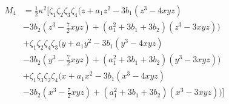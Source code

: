 \begin{equation}\begin{split}
{M_4} &= \frac12 \kappa^2\Big[\zeta_1\zeta_2\zeta_3\zeta_4(z + a_1 z^2  -3b_1(z^3-4xyz) \\& -3b_2(z^3-\frac72xyz)
+(a_1^2+3b_1 + 3b_2)(z^3-3xyz))\\&
+ \zeta_1\zeta_2\zeta_4\zeta_3(y + a_1 y^2 -3b_1(y^3-4xyz)\\&-3b_2(y^3-\frac72xyz)
+(a_1^2+3b_1 + 3b_2)(y^3-3xyz))\\&
+ \zeta_1\zeta_3\zeta_2\zeta_4(x + a_1 x^2 -3b_1(x^3-4xyz)\\&-3b_2(x^3-\frac72xyz)
+(a_1^2+3b_1 + 3b_2)(x^3-3xyz))\Big]
\end{split}\end{equation}


